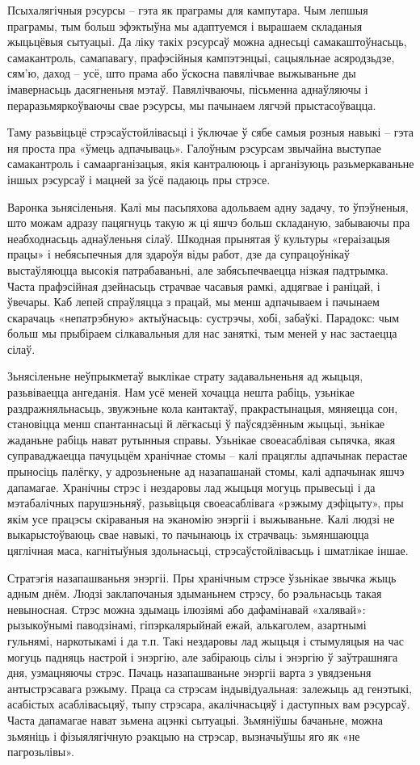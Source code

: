 Псыхалягічныя рэсурсы – гэта як праграмы для кампутара. Чым лепшыя праграмы, тым больш эфэктыўна мы адаптуемся і вырашаем складаныя жыцьцёвыя сытуацыі. Да ліку такіх рэсурсаў можна аднесьці самакаштоўнасьць, самакантроль, самапавагу, прафэсійныя кампэтэнцыі, сацыяльнае асяродзьдзе, сям'ю, даход – усё, што прама або ўскосна павялічвае выжываньне ды імавернасьць дасягненьня мэтаў. Павялічваючы, пісьменна аднаўляючы і пераразьмяркоўваючы свае рэсурсы, мы пачынаем лягчэй прыстасоўвацца. 

Таму разьвіцьцё стрэсаўстойлівасьці і ўключае ў сябе самыя розныя навыкі – гэта ня проста пра «ўмець адпачываць». Галоўным рэсурсам звычайна выступае самакантроль і самаарганізацыя, якія кантралююць і арганізуюць разьмеркаваньне іншых рэсурсаў і мацней за ўсё падаюць пры стрэсе.

Варонка зьнясіленьня. Калі мы пасьпяхова адольваем адну задачу, то ўпэўненыя, што можам адразу пацягнуць такую ж ці яшчэ больш складаную, забываючы пра неабходнасьць аднаўленьня сілаў. Шкодная прынятая ў культуры «гераізацыя працы» і небясьпечныя для здароўя віды работ, дзе да супрацоўнікаў выстаўляюцца высокія патрабаваньні, але забясьпечваецца нізкая падтрымка. Часта прафэсійная дзейнасьць страчвае часавыя рамкі, адцягвае і раніцай, і ўвечары. Каб лепей спраўляцца з працай, мы менш адпачываем і пачынаем скарачаць «непатрэбную» актыўнасьць: сустрэчы, хобі, забаўкі. Парадокс: чым больш мы прыбіраем сілкавальныя для нас заняткі, тым меней у нас застаецца сілаў.

Зьнясіленьне неўпрыкметаў выклікае страту задавальненьня ад жыцьця, разьвіваецца ангеданія. Нам усё меней хочацца нешта рабіць, узьнікае раздражняльнасьць, звужэньне кола кантактаў, пракрастынацыя, мяняецца сон, становіцца менш спантаннасьці й лёгкасьці ў паўсядзённым жыцьці, зьнікае жаданьне рабіць нават рутынныя справы. Узьнікае своеасаблівая сьпячка, якая суправаджаецца пачуцьцём хранічнае стомы – калі працяглы адпачынак перастае прыносіць палёгку, у адрозьненьне ад назапашанай стомы, калі адпачынак яшчэ дапамагае. Хранічны стрэс і нездаровы лад жыцьця могуць прывесьці і да мэтабалічных парушэньняў, разьвіцьця своеасаблівага «рэжыму дэфіцыту», пры якім усе працэсы скіраваныя на эканомію энэргіі і выжываньне. Калі людзі не выкарыстоўваюць свае навыкі, то пачынаюць іх страчваць: зьмяншаюцца цяглічная маса, кагнітыўныя здольнасьці, стрэсаўстойлівасьць і шматлікае іншае.

Стратэгія назапашваньня энэргіі. Пры хранічным стрэсе ўзьнікае звычка жыць адным днём. Людзі заклапочаныя здыманьнем стрэсу, бо рэальнасьць такая невыносная. Стрэс можна здымаць ілюзіямі або дафамінавай «халявай»: рызыкоўнымі паводзінамі, гіпэркалярыйнай ежай, алькаголем, азартнымі гульнямі, наркотыкамі і да т.п. Такі нездаровы лад жыцьця і стымуляцыя на час могуць падняць настрой і энэргію, але забіраюць сілы і энэргію ў заўтрашняга дня, узмацняючы стрэс. Пачаць назапашваньне энэргіі варта з увядзеньня антыстрэсавага рэжыму. Праца са стрэсам індывідуальная: залежыць ад генэтыкі, асабістых асаблівасьцяў, тыпу стрэсара, акалічнасьцяў і даступных вам рэсурсаў. Часта дапамагае нават зьмена ацэнкі сытуацыі. Зьмяніўшы бачаньне, можна зьмяніць і фізыялягічную рэакцыю на стрэсар, вызначыўшы яго як «не пагрозьлівы».

